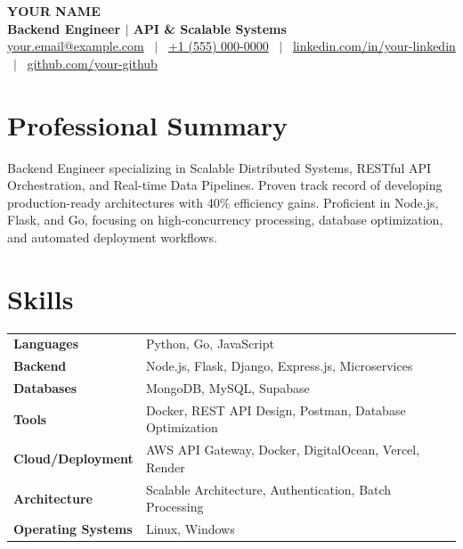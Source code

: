 \documentclass[a4paper,10pt]{article}
\begin{document}
\pagestyle{empty}

\begin{center}
{\LARGE \textbf{YOUR NAME}}\\[3pt]
\textbf{Backend Engineer $|$ API \& Scalable Systems}\\[3pt]
\href{mailto:your.email@example.com}{your.email@example.com}
~$|$~
\href{tel:+910000085302}{+1 (555) 000-0000}
~$|$~
\href{https://www.linkedin.com/in/your-linkedin/}{linkedin.com/in/your-linkedin}
~$|$~
\href{https://github.com/your-github}{github.com/your-github}
\end{center}

\vspace{-5pt}

\section*{Professional Summary}

Backend Engineer specializing in Scalable Distributed Systems, RESTful API Orchestration, and Real-time Data Pipelines. Proven track record of developing production-ready architectures with 40\% efficiency gains. Proficient in Node.js, Flask, and Go, focusing on high-concurrency processing, database optimization, and automated deployment workflows.

\section*{Skills}

\renewcommand{\arraystretch}{1.0}
\begin{tabular}{@{} >{\bfseries}p{3.8cm} p{13cm} @{}}
Languages           & Python, Go, JavaScript \\
Backend             & Node.js, Flask, Django, Express.js, Microservices \\
Databases           & MongoDB, MySQL, Supabase \\
Tools               & Docker, REST API Design, Postman, Database Optimization \\
Cloud/Deployment    & AWS API Gateway, Docker, DigitalOcean, Vercel, Render \\
Architecture        & Scalable Architecture, Authentication, Batch Processing \\
Operating Systems   & Linux, Windows \\
\end{tabular}
\end{document}
